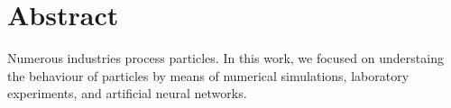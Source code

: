 
\cleardoublepage
{}
{}
\begingroup
\let\clearpage\relax
\let\cleardoublepage\relax
\let\cleardoublepage\relax


\renewcommand{\chaptermark}[1]{\markboth{#1}{}}

\fancyhf{}
\fancyhead[LE,RO]{\thepage}
\fancyhead[RE]{\nouppercase{\leftmark}}
\fancyhead[LO]{\nouppercase{\rightmark}}
\renewcommand{\headrulewidth}{0.5pt}

\renewcommand{\footrulewidth}{0pt}



% 

\chapter*{Abstract}

Numerous industries process particles.
In this work, we focused on understaing the behaviour of particles by means of
numerical simulations, laboratory experiments, and artificial neural networks.

